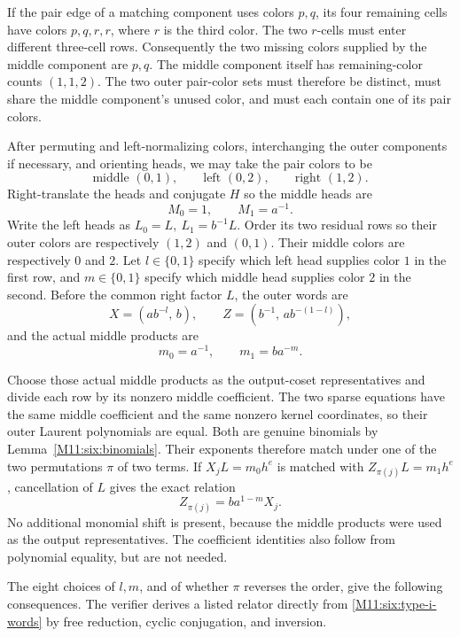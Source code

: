 \documentclass[11pt,a4paper,oneside]{report}
\theoremstyle{definition}
\theoremstyle{remark}
\begin{document}
If the pair edge of a matching component uses colors \(p,q\), its four
remaining cells have colors \(p,q,r,r\), where \(r\) is the third color.
The two \(r\)-cells must enter different three-cell rows. Consequently
the two missing colors supplied by the middle component are \(p,q\).
The middle component itself has remaining-color counts \((1,1,2)\).
The two outer pair-color sets must therefore be distinct, must share
the middle component's unused color, and must each contain one of its
pair colors.

After permuting and left-normalizing colors, interchanging the outer
components if necessary, and orienting heads, we may take the pair
colors to be
\[
 \text{middle }(0,1),\qquad
 \text{left }(0,2),\qquad
 \text{right }(1,2).
\]
Right-translate the heads and conjugate \(H\) so the middle heads are
\[
 M_0=1,\qquad M_1=a^{-1}.
\]
Write the left heads as \(L_0=L,\ L_1=b^{-1}L\).
Order its two residual rows so their outer colors are respectively
\((1,2)\) and \((0,1)\). Their middle colors are respectively \(0\)
and \(2\). Let \(l\in\{0,1\}\) specify which left head supplies color
\(1\) in the first row, and \(m\in\{0,1\}\) specify which middle head
supplies color \(2\) in the second. Before the common right factor \(L\),
the outer words are
\[
 X=(ab^{-l},\,b),\qquad
 Z=(b^{-1},\,ab^{-(1-l)}),
\]
and the actual middle products are
\[
 m_0=a^{-1},\qquad m_1=ba^{-m}.
\]

Choose those actual middle products as the output-coset representatives
and divide each row by its nonzero middle coefficient. The two sparse
equations have the same middle coefficient and the same nonzero
kernel coordinates, so their outer Laurent polynomials are equal.
Both are genuine binomials by Lemma~\ref{M11:six:binomials}. Their exponents
therefore match under one of the two permutations \(\pi\) of two terms.
If \(X_jL=m_0h^e\) is matched with \(Z_{\pi(j)}L=m_1h^e\), cancellation
of \(L\) gives the exact relation
\begin{equation}\label{M11:six:type-i-words}
 Z_{\pi(j)}=ba^{1-m}X_j.
\end{equation}
No additional monomial shift is present, because the middle products
were used as the output representatives. The coefficient identities
also follow from polynomial equality, but are not needed.

The eight choices of \(l,m\), and of whether \(\pi\) reverses the order,
give the following consequences. The verifier derives a listed
relator directly from \eqref{M11:six:type-i-words} by free reduction,
cyclic conjugation, and inversion.
\end{document}
